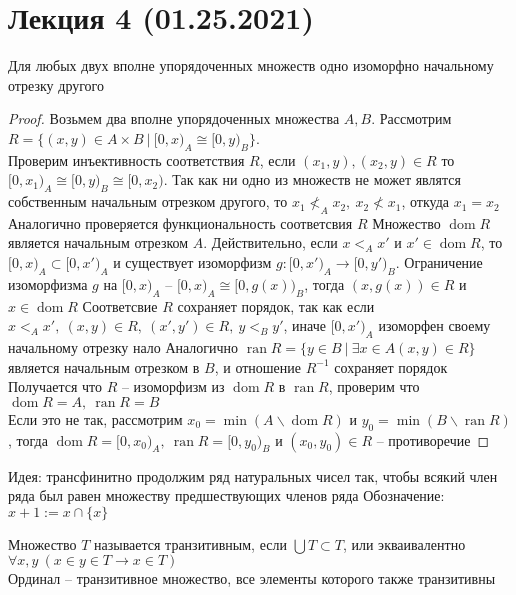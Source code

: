 \section{Лекция 4 (01.25.2021)}

\begin{theo}[Кантор]
Для любых двух вполне упорядоченных множеств одно изоморфно начальному отрезку другого
\end{theo}

\begin{proof}
Возьмем два вполне упорядоченных множества $A, B$. Рассмотрим $R = \{(x,y) \in A \times B\ |\ [0,x)_A \cong [0,y)_B\}$.\\
Проверим инъективность соответствия $R$, если $(x_1, y), (x_2, y) \in R$ то $[0,x_1)_A \cong [0,y)_B \cong [0,x_2)$. Так как ни одно из множеств не может являтся собственным начальным отрезком другого, то $x_1 \not<_A x_2,\ x_2 \not< x_1$, откуда $x_1 = x_2$\\
Аналогично проверяется функциональность соответсвия $R$
\vskip 0.1in
Множество $\operatorname{dom} R$ является начальным отрезком $A$. Действительно, если $x <_A x'$ и $x'\in \operatorname{dom} R$, то $[0, x)_A \subset [0, x')_A$ и существует изоморфизм $g:[0,x')_A \to [0,y')_B$. Ограничение изоморфизма $g$ на $[0, x)_A$ -- $[0,x)_A \cong [0,g(x))_B$, тогда $(x,g(x)) \in R$ и $x \in \operatorname{dom} R$
\vskip 0.1in
Соответсвие $R$ сохраняет порядок, так как если $x <_A x',\ (x,y) \in R,\ (x',y') \in R,\ y <_B y'$, иначе $[0,x')_A$ изоморфен своему начальному отрезку
нало
\vskip 0.1in
Аналогично $\operatorname{ran} R = \{y \in B\ |\ \exists x \in A(x,y) \in R\}$ является начальным отрезком в $B$, и отношение $R^{-1}$ сохраняет порядок
\vskip 0.1in
Получается что $R$ -- изоморфизм из $\operatorname{dom} R$ в $\operatorname{ran} R$, проверим что $\operatorname{dom} R = A,\ \operatorname{ran} R = B$\\
Если это не так, рассмотрим $x_0 = \min(A \backslash \operatorname{dom} R)$ и $y_0 = \min(B \backslash \operatorname{ran} R)$, тогда $\operatorname{dom} R = [0,x_0)_A,\ \operatorname{ran} R = [0, y_0)_B$ и $(x_0, y_0) \in R$ -- противоречие
\end{proof}

Идея: трансфинитно продолжим ряд натуральных чисел так, чтобы всякий член ряда был равен множеству предшествующих членов ряда
\vskip 0.1in
Обозначение: $x + 1 := x \cap \{x\}$

\begin{defn}
Множество $T$ называется транзитивным, если $\bigcup T \subset T$, или экваивалентно $\forall x,y\ (x \in y \in T \to x \in T)$\\
Ординал -- транзитивное множество, все элементы которого также транзитивны
\end{defn}

